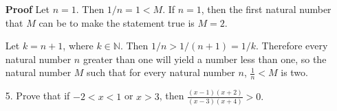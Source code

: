 \documentclass[12pt]{article}
\begin{document}
\begin{enumerate}
  \item[\textbf{Proof}] Let $n=1$. Then $1/n=1<M$. If $n=1$, then the first natural number that $M$ can be to make the statement true is $M=2$.
  \item[] Let $k=n+1$, where $k\in\mathbb{N}$. Then $1/n>1/(n+1)=1/k$. Therefore every natural number $n$ greater than one will yield a number less than one, so the natural number $M$ such that for every natural number $n$, $\frac{1}{n} < M$ is two.
\end{enumerate}

\begin{enumerate}
\item[5.] Prove that if $-2 < x < 1$ or $x > 3$, then $\frac{(x-1)(x+2)}{(x-3)(x+4)} > 0.$
\end{enumerate}
\end{document}
